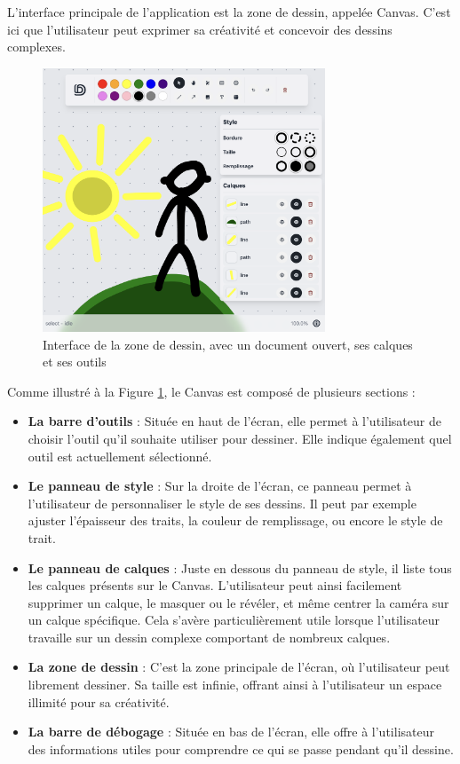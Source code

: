 L'interface principale de l'application est la zone de dessin, appelée \guillemotleft Canvas\guillemotright. C'est ici que l'utilisateur peut exprimer sa créativité et concevoir des dessins complexes.

\begin{figure}[H]
    \centering
    \includegraphics[width=0.75\textwidth]{assets/figures/describble-canvas.png}
    \caption{Interface de la zone de dessin, avec un document ouvert, ses calques et ses outils}
    \label{fig:canvas_interface}
\end{figure}

Comme illustré à la Figure \ref{fig:canvas_interface}, le Canvas est composé de plusieurs sections :

\begin{itemize}
    \item \textbf{La barre d'outils} : Située en haut de l'écran, elle permet à l'utilisateur de choisir l'outil qu'il souhaite utiliser pour dessiner. Elle indique également quel outil est actuellement sélectionné.
    \item \textbf{Le panneau de style} : Sur la droite de l'écran, ce panneau permet à l'utilisateur de personnaliser le style de ses dessins. Il peut par exemple ajuster l'épaisseur des traits, la couleur de remplissage, ou encore le style de trait.
    \item \textbf{Le panneau de calques} : Juste en dessous du panneau de style, il liste tous les calques présents sur le Canvas. L'utilisateur peut ainsi facilement supprimer un calque, le masquer ou le révéler, et même centrer la caméra sur un calque spécifique. Cela s'avère particulièrement utile lorsque l'utilisateur travaille sur un dessin complexe comportant de nombreux calques.
    \item \textbf{La zone de dessin} : C'est la zone principale de l'écran, où l'utilisateur peut librement dessiner. Sa taille est infinie, offrant ainsi à l'utilisateur un espace illimité pour sa créativité.
    \item \textbf{La barre de débogage} : Située en bas de l'écran, elle offre à l'utilisateur des informations utiles pour comprendre ce qui se passe pendant qu'il dessine.
\end{itemize}

